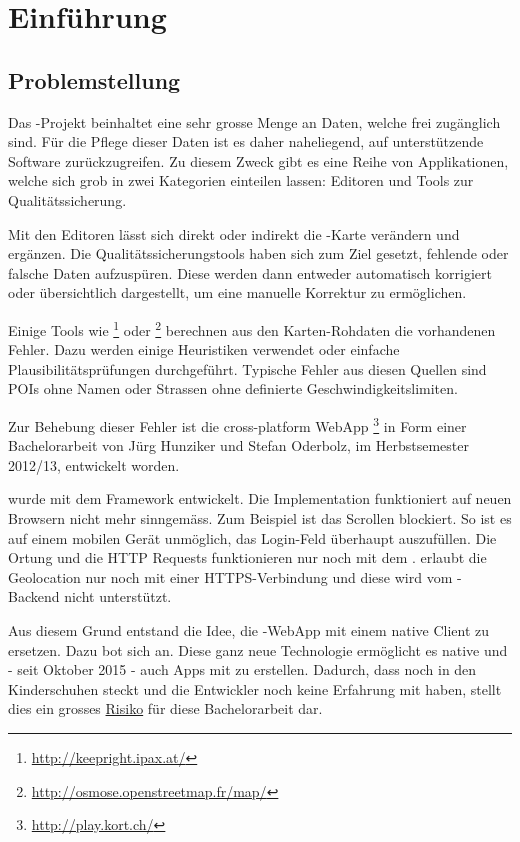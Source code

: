 \chapter{Einführung}
\label{tb-einfuehrung}

\section{Problemstellung}
Das -Projekt beinhaltet eine sehr grosse Menge an Daten, welche frei zugänglich sind.
Für die Pflege dieser Daten ist es daher naheliegend, auf unterstützende Software zurückzugreifen.
Zu diesem Zweck gibt es eine Reihe von Applikationen, welche sich grob in zwei Kategorien einteilen lassen:
Editoren und Tools zur Qualitätssicherung.

Mit den Editoren lässt sich direkt oder indirekt die -Karte verändern und ergänzen.
Die Qualitätssicherungstools haben sich zum Ziel gesetzt, fehlende oder falsche Daten aufzuspüren.
Diese werden dann entweder automatisch korrigiert oder übersichtlich dargestellt, um eine manuelle Korrektur zu ermöglichen.

Einige Tools wie \footnote{\url{http://keepright.ipax.at/}} oder \footnote{\url{http://osmose.openstreetmap.fr/map/}} berechnen aus den Karten-Rohdaten die vorhandenen Fehler.
Dazu werden einige Heuristiken verwendet oder einfache Plausibilitätsprüfungen durchgeführt.
Typische Fehler aus diesen Quellen sind \glspl{POI} ohne Namen oder Strassen ohne definierte Geschwindigkeitslimiten.

Zur Behebung dieser Fehler ist die cross-platform \gls{WebApp} \kort{}\footnote{\url{http://play.kort.ch/}} in Form einer Bachelorarbeit von Jürg Hunziker und Stefan Oderbolz, im Herbstsemester 2012/13, entwickelt  worden.

\kort{} wurde mit dem  \gls{Framework} entwickelt.
Die Implementation funktioniert auf neuen Browsern nicht mehr sinngemäss.
Zum Beispiel ist das Scrollen blockiert.
So ist es auf einem mobilen Gerät unmöglich, das Login-Feld überhaupt auszufüllen.
Die Ortung und die HTTP Requests funktionieren nur noch mit dem .
 erlaubt die Geolocation nur noch mit einer HTTPS-Verbindung und diese wird vom \kort{}-Backend nicht unterstützt.

Aus diesem Grund entstand die Idee, die \kort{}-\gls{WebApp} mit einem native Client zu ersetzen.
Dazu bot sich  an. 
Diese ganz neue Technologie ermöglicht es native  und - seit Oktober 2015 - auch  Apps mit  zu erstellen. 
Dadurch, dass  noch in den Kinderschuhen steckt und die Entwickler noch keine Erfahrung mit  haben, stellt dies ein grosses \hyperref[pm-projektmanagement-risikomanagement]{Risiko} für diese Bachelorarbeit dar.

